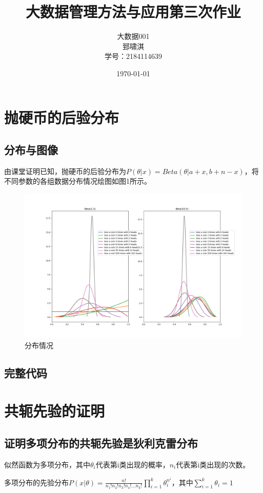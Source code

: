 \documentclass[12pt, a4paper, oneside, fontset=windows]{ctexart}
\title{\textbf{大数据管理方法与应用第三次作业}}
\author{大数据001\\郅啸淇\\学号：2184114639}
\date{\today}
\begin{document}
\maketitle
\newpage
\newpage
\section{抛硬币的后验分布}
\subsection{分布与图像}
由课堂证明已知，抛硬币的后验分布为$P(\theta |x) = Beta(\theta|a+x,b+n-x)$，将不同参数的各组数据分布情况绘图如图1所示。
\begin{figure}[h]
    \centering
    \includegraphics[scale = 0.4]{tossCoin.png}
    \caption{分布情况}
\end{figure}
\newpage
\subsection{完整代码}

\section{共轭先验的证明}
\subsection{证明多项分布的共轭先验是狄利克雷分布}
似然函数为多项分布，其中$\theta_i$代表第i类出现的概率，$n_i$代表第i类出现的次数。

多项分布的先验分布$P(x|\theta) = \frac{n!}{n_1!n_2!n_3!n_4!...n_k!} \prod_{i = 1}^{k} \theta_{i}^{n^{i}}$，其中$\sum_{i = 1}^{k} \theta_i  =1$
\end{document}
